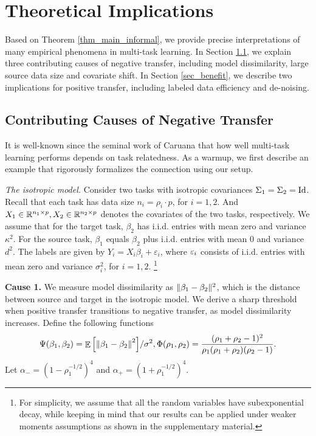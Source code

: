 



\section{Theoretical Implications}
\label{sec_insight}

Based on Theorem \ref{thm_main_informal}, we provide precise interpretations of many empirical phenomena in multi-task learning.
In Section \ref{sec_similarity}, we explain three contributing causes of negative transfer, including model dissimilarity, large source data size and covariate shift.
In Section \ref{sec_benefit}, we describe two implications for positive transfer, including labeled data efficiency and de-noising.

\subsection{Contributing Causes of Negative Transfer}\label{sec_similarity}

It is well-known since the seminal work of Caruana \cite{C97} that how well multi-task learning performs depends on task relatedness.
As a warmup, we first describe an example that rigorously formalizes the connection using our setup.

\textit{The isotropic model.}
	Consider two tasks with isotropic covariances $\Sigma_1 = \Sigma_2 = \operatorname{Id}$.
	Recall that each task has data size $n_i = \rho_i \cdot p$, for $i = 1, 2$.
	And $X_1\in\mathbb{R}^{n_1\times p}, X_2\in\mathbb{R}^{n_2\times p}$ denotes the covariates of the two tasks, respectively.
	We assume that for the target task, $\beta_2$ has i.i.d. entries with mean zero and variance $\kappa^2$.
	For the source task, $\beta_1 $ equals $\beta_2$ plus i.i.d. entries with mean $0$ and variance $d^2$.
	The labels are given by $Y_i = X_i\beta_i + \varepsilon_i$, where ${\varepsilon}_i$ consists of i.i.d. entries with mean zero and variance $\sigma_i^2$, for $i=1,2$.
	\footnote{For simplicity, we assume that all the random variables have subexponential decay, while keeping in mind that our results can be applied under weaker moments assumptions as shown in the supplementary material.}

\textbf{Cause 1.}
We measure model dissimilarity as $\|\beta_1 - \beta_2\|^2$, which is the distance between source and target in the isotropic model.
We derive a sharp threshold when positive transfer transitions to negative transfer, as model dissimilarity increases.
Define the following functions
\begin{align*}
	\Psi(\beta_1, \beta_2) = {\mathop{\mathbb{E}}\left[ \left\| \beta_1 - \beta_2 \right\|^2 \right]} / {\sigma^2},  \Phi(\rho_1, \rho_2) = \frac{(\rho_1 + \rho_2 - 1)^2}{\rho_1 (\rho_1 + \rho_2) (\rho_2 - 1)}.
\end{align*}
Let $\alpha_{-} = (1 - \rho_1^{-1/2})^4$ and $\alpha_{+} = (1 + \rho_1^{-1/2})^4$.

